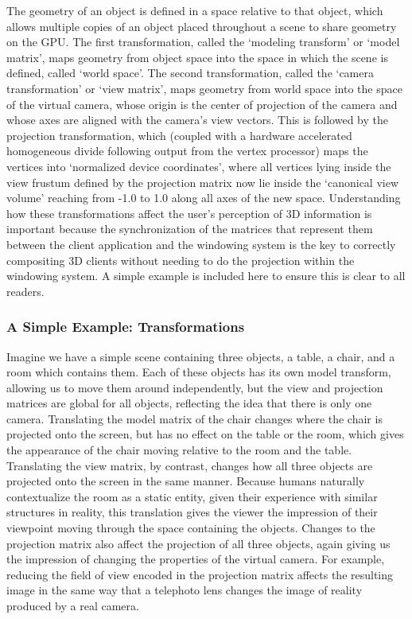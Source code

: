 The geometry of an object is defined in a space relative to that object, which allows multiple copies of an object placed throughout a scene to share geometry on the GPU. The first transformation, called the `modeling transform' or `model matrix', maps geometry from object space into the space in which the scene is defined, called `world space'. The second transformation, called the `camera transformation'  or `view matrix', maps geometry from world space into the space of the virtual camera, whose origin is the center of projection of the camera and whose axes are aligned with the camera's view vectors. This is followed by the projection transformation, which (coupled with a hardware accelerated homogeneous divide following output from the vertex processor) maps the vertices into `normalized device coordinates', where all vertices lying inside the view frustum defined by the projection matrix now lie inside the `canonical view volume' reaching from -1.0 to 1.0 along all axes of the new space.
Understanding how these transformations affect the user's perception of 3D information is important because the synchronization of the matrices that represent them between the client application and the windowing system is the key to correctly compositing 3D clients without needing to do the projection within the windowing system. A simple example is included here to ensure this is clear to all readers.

\subsubsection{A Simple Example: Transformations}

Imagine we have a simple scene containing three objects, a table, a chair, and a room which contains them. Each of these objects has its own model transform, allowing us to move them around independently, but the view and projection matrices are global for all objects, reflecting the idea that there is only one camera. Translating the model matrix of the chair changes where the chair is projected onto the screen, but has no effect on the table or the room, which gives the appearance of the chair moving relative to the room and the table. Translating the view matrix, by contrast, changes how all three objects are projected onto the screen in the same manner. Because humans naturally contextualize the room as a static entity, given their experience with similar structures in reality, this translation gives the viewer the impression of their viewpoint moving through the space containing the objects. Changes to the projection matrix also affect the projection of all three objects, again giving us the impression of changing the properties of the virtual camera. For example, reducing the field of view encoded in the projection matrix affects the resulting image in the same way that a telephoto lens changes the image of reality produced by a real camera. 

